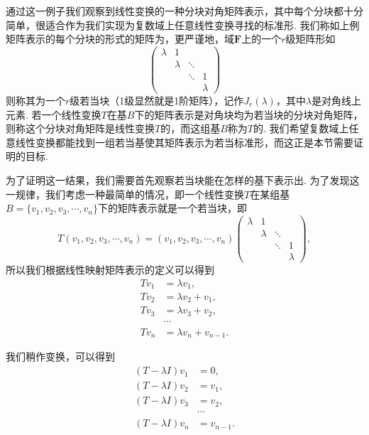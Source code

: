 通过这一例子我们观察到线性变换的一种分块对角矩阵表示，其中每个分块都十分简单，很适合作为我们实现为复数域上任意线性变换寻找的标准形. 我们称如上例矩阵表示的每个分块的形式的矩阵为，更严谨地，域$\mathbf{F}$上的一个$r$级矩阵形如\[\begin{pmatrix}
    \lambda & 1 &        &   \\
      & \lambda & \ddots &   \\
      &   & \ddots & 1 \\
      &   &        & \lambda
\end{pmatrix}\]
则称其为一个$r$级若当块（1级显然就是1阶矩阵），记作$J_r(\lambda)$，其中$\lambda$是对角线上元素. 若一个线性变换$T$在基$B$下的矩阵表示是对角块均为若当块的分块对角矩阵，则称这个分块对角矩阵是线性变换$T$的，而这组基$B$称为$T$的. 我们希望复数域上任意线性变换都能找到一组若当基使其矩阵表示为若当标准形，而这正是本节需要证明的目标.

为了证明这一结果，我们需要首先观察若当块能在怎样的基下表示出. 为了发现这一规律，我们考虑一种最简单的情况，即一个线性变换$T$在某组基$B=\{v_1,v_2,v_3,\cdots,v_n\}$下的矩阵表示就是一个若当块，即
\[T(v_1,v_2,v_3,\cdots,v_n)=(v_1,v_2,v_3,\cdots,v_n)\begin{pmatrix}
    \lambda & 1 &        &   \\
      & \lambda & \ddots &   \\
      &   & \ddots & 1 \\
      &   &        & \lambda
\end{pmatrix},\]
所以我们根据线性映射矩阵表示的定义可以得到
\begin{align*}
    Tv_1&=\lambda v_1,\\
    Tv_2&=\lambda v_2+v_1,\\
    Tv_3&=\lambda v_3+v_2,\\
    &\cdots\\
    Tv_n&=\lambda v_n+v_{n-1}.
\end{align*}

我们稍作变换，可以得到
\begin{align*}
    (T-\lambda I)v_1&=0,\\
    (T-\lambda I)v_2&=v_1,\\
    (T-\lambda I)v_3&=v_2,\\
    &\cdots\\
    (T-\lambda I)v_n&=v_{n-1}.
\end{align*}

